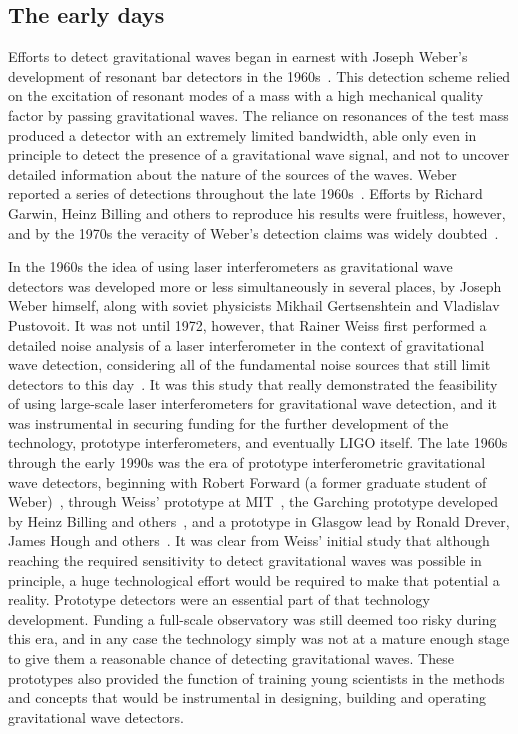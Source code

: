 \subsection{The early days}
Efforts to detect gravitational waves began in earnest with Joseph Weber's development of resonant bar detectors 
in the 1960s~\cite{Weber_1968}. This detection scheme relied on the excitation of resonant modes of a mass with a high mechanical 
quality factor by passing gravitational waves. The reliance on resonances of the test mass produced a detector 
with an extremely limited bandwidth, able only even in principle to detect the presence of a gravitational wave signal, and not 
to uncover detailed information about the nature of the sources of the waves. 
Weber reported a series of detections throughout the late 1960s~\cite{Weber_1969}. Efforts by Richard Garwin, Heinz Billing and others 
to reproduce his results were fruitless, however, and by the 1970s the veracity of Weber's detection claims was widely doubted~\cite{Garwin_1973, Kafka_1978}. 

In the 1960s the idea of using laser interferometers as gravitational wave detectors was developed more or less simultaneously 
in several places, by Joseph Weber himself, along with soviet physicists Mikhail Gertsenshtein and Vladislav Pustovoit. 
It was not until 1972, however, that Rainer Weiss first performed a detailed noise analysis of a laser interferometer in the context 
of gravitational wave detection, considering all of the fundamental noise sources that still limit detectors to this day~\cite{Weiss1972}. 
It was this study that really demonstrated the feasibility of using large-scale laser interferometers for gravitational wave detection, and 
it was instrumental in securing funding for the further development of the technology, prototype interferometers, and eventually LIGO itself. 
The late 1960s through the early 1990s was the era of prototype interferometric gravitational wave detectors, beginning with 
Robert Forward (a former graduate student of Weber)~\cite{Forward_1978}, through Weiss' prototype at MIT~\cite{Dewey_1984}, the Garching prototype developed by 
Heinz Billing and others~\cite{Shoemaker1988}, and a prototype in Glasgow lead by Ronald Drever, James Hough and others~\cite{Robertson_1995}. 
It was clear from Weiss' initial study that although reaching the required sensitivity to detect gravitational waves 
was possible in principle, a huge technological effort would 
be required to make that potential a reality. 
Prototype detectors were an essential part of that technology development. Funding a full-scale 
observatory was still deemed too risky during this era, and in any case the technology simply was not at a mature enough stage to give them 
a reasonable chance of detecting gravitational waves. These prototypes also provided the function 
of training young scientists in the methods and concepts that would be instrumental in 
designing, building and operating gravitational wave detectors. 

